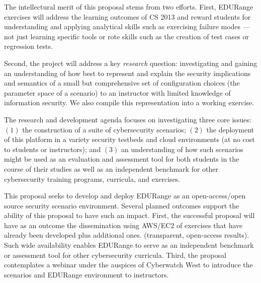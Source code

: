 \documentclass[11pt]{report}
\newcommand{\eat}[1]{}
\begin{document}
The intellectural merit of this proposal stems from two efforts.
First, EDURange exercises will address the learning outcomes of CS 2013
and reward students for understanding and
applying analytical skills such as exercising failure modes --- 
not just learning specific tools or rote skills
such as the creation of test cases or regression tests.  

\eat{EDURange is
designed to provide students with an un-scripted active learning
environment so that students see the value of developing analysis
skills rather than training based on a pre-packaged set of tools.}

Second, the project will address a key {\em research} question:
investigating and gaining an understanding of how best to represent and explain the
security implications and semantics of a small but comprehensive set of
configuration choices (the parameter space of a scenario) to an
instructor with limited knowledge of information security.  We also
compile this representation into a working exercise.

The research and development agenda focuses on investigating three
core issues: $(1)$ the construction of a suite of cybersecurity
scenarios; $(2)$ the deployment of this platform in a variety security
testbeds and cloud environments (at no cost to students or
instructors); and $(3)$ an understanding of how such scenarios might
be used as an evaluation and assessment tool for both students in the
course of their studies as well as an independent benchmark for other
cybersecurity training programs, curricula, and exercises.

This proposal seeks to develop and
deploy EDURange as an open-access/open source security scenario environment.
Several planned outcomes support the ability of this proposal to have
such an impact.  First, the successful proposal will have as an
outcome the dissemination using AWS/EC2 of exercises that have already been developed plus
additional ones.
(transparent, open-access results).  \eat{Second, these scenarios will be
implemented and hosted in a stable, widely-available infrastructure in
an existing cybersecurity testbed and in a cloud environment (specific
dissemination plan for real-world impact).}  Such wide availability
enables EDURange to serve as an independent benchmark or assessment
tool for other cybersecurity curricula.  Third, the proposal
contemplates a webinar under the auspices of Cyberwatch West
to introduce the scenarios and EDURange environment to 
instructors. 
\end{document}

